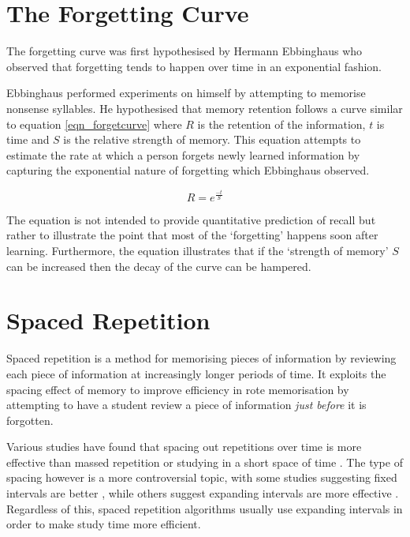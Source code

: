 \section{The Forgetting Curve} \label{background_forgettingcurves}
The forgetting curve was first hypothesised by Hermann
Ebbinghaus\cite{ebbinghaus_memory:_1913} who observed that forgetting tends
to happen over time in an exponential fashion.

Ebbinghaus performed experiments on himself by attempting to memorise nonsense
syllables. He hypothesised that memory retention follows a curve similar to
equation \ref{eqn_forgetcurve} where $R$ is the retention of the information,
$t$ is time and $S$ is the relative strength of memory. This equation attempts to
estimate the rate at which a person forgets newly learned information by capturing
the exponential nature of forgetting which Ebbinghaus observed.

\begin{equation}
\label{eqn_forgetcurve}
R = e^{\frac{-t}{S}}
\end{equation}

The equation
is not intended to provide quantitative prediction of recall but rather to illustrate
the point that most of the `forgetting' happens soon after learning. Furthermore,
the equation illustrates that if the `strength of memory' $S$ can
be increased then the decay of the curve can be hampered.



\section{Spaced Repetition} \label{background_spacedrepetition}
Spaced repetition is a method for memorising pieces of information by reviewing
each piece of information at increasingly longer periods of time. It exploits the 
spacing effect of memory to improve efficiency in rote memorisation by attempting to 
have a student review a piece of
information \textit{just before} it is forgotten. 

Various studies have found that spacing out repetitions over time is
more effective than massed repetition or studying in a short space of time \cite{distributed_massed_2005}.
The type of spacing however is a more controversial topic, with some studies suggesting
fixed intervals are better \cite{fixed_intervals_2005}, while others suggest expanding intervals
are more effective \cite{effects_of_spacing_1963}. Regardless of this, spaced
repetition algorithms usually use expanding intervals in order to make study
time more efficient.

